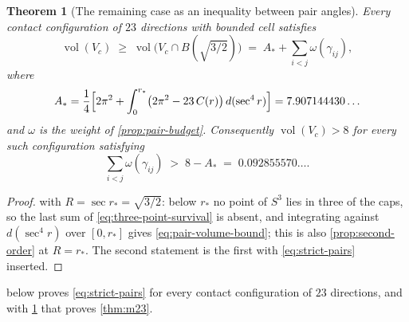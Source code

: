 \documentclass[11pt,reqno]{amsart}
\renewcommand{\_}{\origunderscore\allowbreak}
\numberwithin{equation}{section}
\theoremstyle{plain}
\newtheorem{thm}{Theorem}[section]
\theoremstyle{definition}
\theoremstyle{remark}
\DeclareMathOperator{\vol}{vol}
\begin{document}
\begin{thm}[The remaining case as an inequality between pair angles]\label{thm:strict-reduction}
Every contact configuration of $23$ directions with bounded cell
satisfies
\begin{equation}\label{eq:pair-volume-bound}
  \vol(V_c)\;\ge\;\vol\bigl(V_c\cap B(\sqrt{3/2})\bigr)
  \;=\;A_*+\sum_{i<j}\omega(\gamma_{ij}),
\end{equation}
where
\[
  A_*=\frac14\Bigl[2\pi^2+\int_0^{r_*}\bigl(2\pi^2-23\,C(r)\bigr)\,d(\sec^4r)\Bigr]
  =7.907144430\ldots
\]
and $\omega$ is the weight of \cref{prop:pair-budget}. Consequently
$\vol(V_c)>8$ for every such configuration satisfying
\begin{equation}\label{eq:strict-pairs}
  \sum_{i<j}\omega(\gamma_{ij})\;>\;8-A_*\;=\;0.092855570\ldots .
\end{equation}
\end{thm}

\begin{proof}
 with $R=\sec r_*=\sqrt{3/2}$: below $r_*$ no
point of $S^3$ lies in three of the caps, so the last sum of
\eqref{eq:three-point-survival} is absent, and integrating against
$d(\sec^4r)$ over $[0,r_*]$ gives \eqref{eq:pair-volume-bound}; this is
also \cref{prop:second-order} at $R=r_*$. The second statement is the
first with \eqref{eq:strict-pairs} inserted.
\end{proof}

 below proves \eqref{eq:strict-pairs} for every
contact configuration of $23$ directions, and with
\cref{thm:strict-reduction} that proves \cref{thm:m23}.
\end{document}
